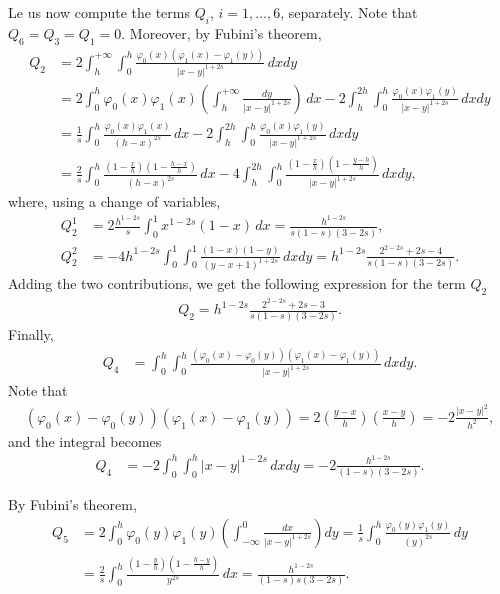 \documentclass[11 pt]{article}
\numberwithin{equation}{section}
\begin{document}
Le us now compute the terms $Q_i$, $i=1,\ldots,6$, separately.   Note that $Q_6=Q_3=Q_1 = 0.$ Moreover, by Fubini's theorem,
\begin{align*}
	Q_2 &= 2\int_{h}^{+\infty}\int_{0}^{h} \frac{\varphi_0(x)(\varphi_{1}(x)-\varphi_{1}(y))}{|x-y|^{1+2s}}\,dxdy\\
	&= 2\int_{0}^{h}\varphi_0(x)\varphi_{1}(x)\left(\int_{h}^{+\infty} \frac{dy}{|x-y|^{1+2s}}\right)\,dx - 2\int_{h}^{2h}\int_{0}^{h} \frac{\varphi_0(x)\varphi_{1}(y)}{|x-y|^{1+2s}}\,dxdy 
	\\
	&= \frac{1}{s}\int_{0}^{h}\frac{\varphi_0(x)\varphi_{1}(x)}{(h-x)^{2s}}\,dx - 2\int_{h}^{2h}\int_{0}^{h} \frac{\varphi_0(x)\varphi_{1}(y)}{|x-y|^{1+2s}}\,dxdy
	\\
	&= \frac{2}{s}\int_{0}^{h}\frac{\left(1-\frac{x}{h}\right)\left(1-\frac{h-x}{h}\right)}{(h-x)^{2s}}\,dx - 4\int_{h}^{2h}\int_{0}^{h} \frac{\left(1-\frac{x}{h}\right)\left(1-\frac{y-h}{h}\right)}{|x-y|^{1+2s}}\,dxdy,
\end{align*}
where, using a change of variables,
\begin{align*}
Q_2^1&=2\frac{h^{1-2s}}{s}\int_0^1 x^{1-2s}(1-x)\,dx = \frac{h^{1-2s}}{s(1-s)(3-2s)},\\
Q_2^2 &= -4h^{1-2s}\int_0^1\int_0^1\frac{(1-x)(1-y)}{(y-x+1)^{1+2s}}\,dxdy = h^{1-2s}\frac{2^{2-2s}+2s-4}{s(1-s)(3-2s)}.
\end{align*}
Adding the two contributions, we get the following expression for the term $Q_2$
\begin{align*}
	Q_2 = h^{1-2s}\frac{2^{2-2s}+2s-3}{s(1-s)(3-2s)}.
\end{align*}
Finally, 
\begin{align*}
	Q_4 &= \int_{0}^{h}\int_{0}^{h} \frac{(\varphi_0(x)-\varphi_0(y))(\varphi_{1}(x)-\varphi_{1}(y))}{|x-y|^{1+2s}}\,dxdy. 
\end{align*}
Note that
\begin{align*}
	(\varphi_0(x)-\varphi_0(y))(\varphi_{1}(x)-\varphi_{1}(y)) = 2\left(\frac{y-x}{h}\right)\left(\frac{x-y}{h}\right) = -2\frac{|x-y|^2}{h^2},
\end{align*}
and the integral becomes
\begin{align*}
	Q_4 &= -2\int_{0}^{h}\int_{0}^{h} |x-y|^{1-2s}\,dxdy = -2\frac{h^{1-2s}}{(1-s)(3-2s)}. 
\end{align*}

By Fubini's theorem,
\begin{align*}
	Q_5 &= 2\int_{0}^{h}\varphi_0(y)\varphi_{1}(y)\left(\int_{-\infty}^{0} \frac{dx}{|x-y|^{1+2s}}\right)dy = \frac{1}{s}\int_{0}^{h}\frac{\varphi_0(y)\varphi_{1}(y)}{(y)^{2s}}\,dy \\
	&= \frac{2}{s}\int_{0}^{h}\frac{\left(1-\frac{y}{h}\right)\left(1-\frac{h-y}{h}\right)}{y^{2s}}\,dx=\frac{h^{1-2 s}}{(1-s) s (3-2 s)}.
\end{align*}
\end{document}
